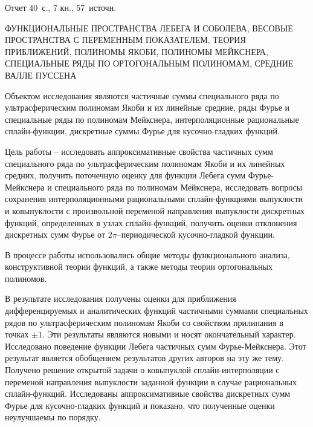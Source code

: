 \Referat %
Отчет 40~с., 7 кн., 57~источн.

ФУНКЦИОНАЛЬНЫЕ ПРОСТРАНСТВА ЛЕБЕГА И СОБОЛЕВА,
ВЕСОВЫЕ ПРОСТРАНСТВА С ПЕРЕМЕННЫМ ПОКАЗАТЕЛЕМ,
ТЕОРИЯ ПРИБЛИЖЕНИЙ,
ПОЛИНОМЫ ЯКОБИ,
ПОЛИНОМЫ МЕЙКСНЕРА,
СПЕЦИАЛЬНЫЕ РЯДЫ ПО ОРТОГОНАЛЬНЫМ ПОЛИНОМАМ,
СРЕДНИЕ ВАЛЛЕ ПУССЕНА


Объектом исследования являются частичные суммы специального ряда по ультрасферическим полиномам Якоби и их линейные средние, ряды Фурье и специальные ряды по полиномам Мейкснера, интерполяционные рациональные сплайн-функции, дискретные суммы Фурье для кусочно-гладких функций.

Цель работы -- исследовать аппроксимативные свойства частичных сумм специального ряда по ультрасферическим полиномам Якоби и их линейных средних, получить поточечную оценку для функции Лебега сумм Фурье-Мейкснера и специального ряда по полиномам Мейкснера, исследовать вопросы сохранения интерполяционными рациональными
сплайн-функциями выпуклости и ковыпуклости с произвольной переменой направления выпуклости дискретных функций, определенных в узлах сплайн-функций, получить оценки отклонения дискретных сумм Фурье от $2\pi$--периодической кусочно-гладкой функции.

В процессе работы использовались общие методы функционального анализа, конструктивной теории функций, а также методы теории ортогональных полиномов.

В результате исследования получены оценки для приближения дифференцируемых и аналитических функций частичными суммами специальных рядов по ультрасферическим полиномам Якоби со свойством прилипания в точках $\pm1$. Эти результаты являются новыми и носят окончательный характер.
Исследовано поведение функции Лебега частичных сумм Фурье-Мейкснера. Этот результат является обобщением результатов других авторов на эту же тему.
Получено решение открытой задачи о ковыпуклой сплайн-интерполяции с переменой направления выпуклости заданной функции в случае рациональных сплайн-функций.
Исследованы аппроксимативные свойства дискретных сумм Фурье для кусочно-гладких функций и показано, что полученные оценки неулучшаемы по порядку.

